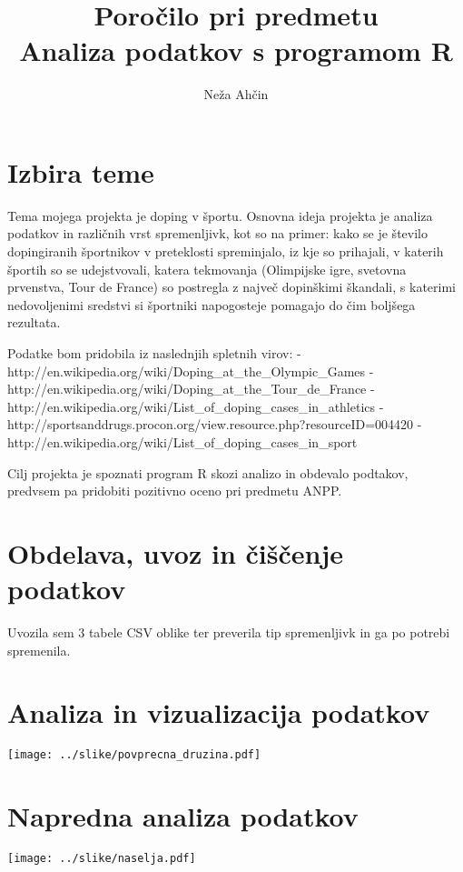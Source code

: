 \documentclass[11pt,a4paper]{article}
\begin{document}
\title{Poročilo pri predmetu \\
Analiza podatkov s programom R}
\author{Neža Ahčin}
\maketitle

\section{Izbira teme}
Tema mojega projekta je doping v športu. Osnovna ideja projekta je analiza podatkov in različnih vrst spremenljivk, kot so na primer: kako se je število dopingiranih športnikov v preteklosti spreminjalo, iz kje so prihajali, v katerih športih so se udejstvovali, katera tekmovanja (Olimpijske igre, svetovna prvenstva, Tour de France) so postregla z največ dopinškimi škandali, s katerimi nedovoljenimi sredstvi si športniki napogosteje pomagajo do čim boljšega rezultata.

Podatke bom pridobila iz naslednjih spletnih virov:
- http://en.wikipedia.org/wiki/Doping_at_the_Olympic_Games
- http://en.wikipedia.org/wiki/Doping_at_the_Tour_de_France
- http://en.wikipedia.org/wiki/List_of_doping_cases_in_athletics
- http://sportsanddrugs.procon.org/view.resource.php?resourceID=004420
- http://en.wikipedia.org/wiki/List_of_doping_cases_in_sport

Cilj projekta je spoznati program R skozi analizo in obdevalo podtakov, predvsem pa pridobiti pozitivno oceno pri predmetu ANPP.

\section{Obdelava, uvoz in čiščenje podatkov}
Uvozila sem 3 tabele CSV oblike ter preverila tip spremenljivk in ga po potrebi spremenila.

\section{Analiza in vizualizacija podatkov}

\texttt{[image: ../slike/povprecna\_druzina.pdf]}

\section{Napredna analiza podatkov}

\texttt{[image: ../slike/naselja.pdf]}
\end{document}
